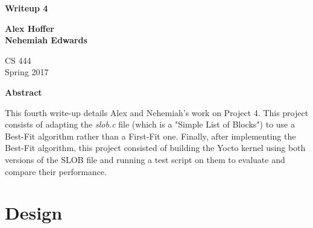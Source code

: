 \documentclass[letterpaper,10pt,titlepage]{article}
\begin{document}
\begin{titlepage}
    \begin{center}
        \vspace*{3.5cm}

        \textbf{Writeup 4}

        \vspace{0.5cm}

        \textbf{Alex Hoffer\\}
	\textbf{Nehemiah Edwards}

        \vspace{0.8cm}

        CS 444\\
        Spring 2017\\

        \vspace{1cm}

        \textbf{Abstract}\\

        \vspace{0.5cm}

	This fourth write-up details Alex and Nehemiah's work on Project 4. This project consists of adapting the \emph{slob.c} file (which is a "Simple List of Blocks") to use a Best-Fit algorithm rather than a First-Fit one. Finally, after implementing the Best-Fit algorithm, this project consisted of building the Yocto kernel using both versions of the SLOB file and running a test script on them to evaluate and compare their performance. 

        \vfill

    \end{center}
\end{titlepage}

\newpage

\tableofcontents

\newpage
\section{Design}
\end{document}
